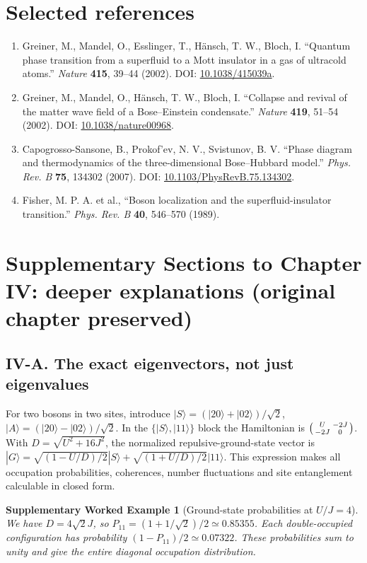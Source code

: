 \documentclass[11pt,a4paper]{article}
\newcounter{example}\newenvironment{worked}[1]{\refstepcounter{example}\par\medskip\noindent\textbf{\color{violet}Worked Example \theexample. #1}\par\smallskip}{\par\medskip}
\newtheorem{supplexample}{Supplementary Worked Example}
\begin{document}
\section*{Selected references}
\begin{enumerate}
\item Greiner, M., Mandel, O., Esslinger, T., H\"ansch, T. W., Bloch, I. ``Quantum phase transition from a superfluid to a Mott insulator in a gas of ultracold atoms.'' \emph{Nature} \textbf{415}, 39--44 (2002). DOI: \href{https://doi.org/10.1038/415039a}{10.1038/415039a}.
\item Greiner, M., Mandel, O., H\"ansch, T. W., Bloch, I. ``Collapse and revival of the matter wave field of a Bose--Einstein condensate.'' \emph{Nature} \textbf{419}, 51--54 (2002). DOI: \href{https://doi.org/10.1038/nature00968}{10.1038/nature00968}.
\item Capogrosso-Sansone, B., Prokof'ev, N. V., Svistunov, B. V. ``Phase diagram and thermodynamics of the three-dimensional Bose--Hubbard model.'' \emph{Phys. Rev. B} \textbf{75}, 134302 (2007). DOI: \href{https://doi.org/10.1103/PhysRevB.75.134302}{10.1103/PhysRevB.75.134302}.
\item Fisher, M. P. A. et al., ``Boson localization and the superfluid-insulator transition.'' \emph{Phys. Rev. B} \textbf{40}, 546--570 (1989).
\end{enumerate}

\clearpage
\section*{Supplementary Sections to Chapter IV: deeper explanations (original chapter preserved)}
\subsection*{IV-A. The exact eigenvectors, not just eigenvalues}
For two bosons in two sites, introduce $|S\rangle=(|20\rangle+|02\rangle)/\sqrt2$, $|A\rangle=(|20\rangle-|02\rangle)/\sqrt2$. In the $\{|S\rangle,|11\rangle\}$ block the Hamiltonian is $\begin{psmallmatrix}U&-2J\\-2J&0\end{psmallmatrix}$. With $D=\sqrt{U^2+16J^2}$, the normalized repulsive-ground-state vector is $|G\rangle=\sqrt{(1-U/D)/2}|S\rangle+\sqrt{(1+U/D)/2}|11\rangle$. This expression makes all occupation probabilities, coherences, number fluctuations and site entanglement calculable in closed form.
\begin{supplexample}[Ground-state probabilities at $U/J=4$]
We have $D=4\sqrt2 J$, so $P_{11}=(1+1/\sqrt2)/2\simeq0.85355$. Each double-occupied configuration has probability $(1-P_{11})/2\simeq0.07322$. These probabilities sum to unity and give the entire diagonal occupation distribution.
\end{supplexample}
\end{document}
